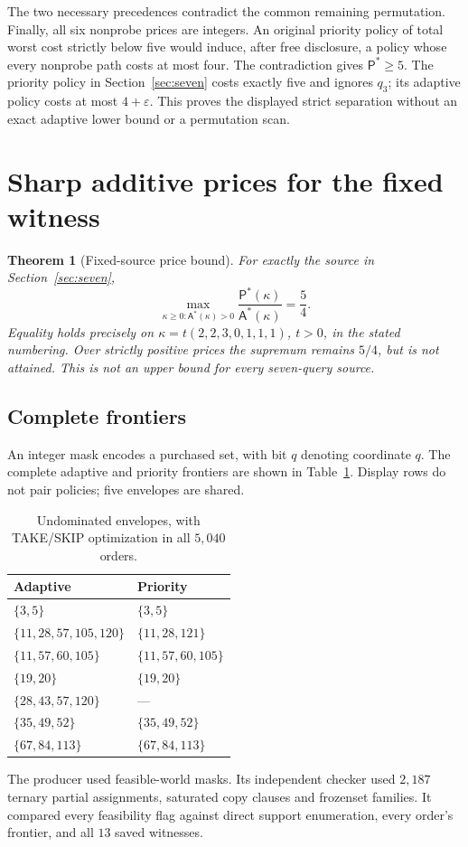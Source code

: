 \documentclass[pdflatex,sn-mathphys-num]{sn-jnl}
\newcommand{\A}{\mathsf{A}}
\newcommand{\Pcost}{\mathsf{P}}
\theoremstyle{thmstyleone}
\newtheorem{theorem}{Theorem}
\theoremstyle{thmstylethree}
\theoremstyle{thmstyletwo}
\begin{document}
The two necessary precedences contradict the common remaining
permutation. Finally, all six nonprobe prices are integers. An original
priority policy of total worst cost strictly below five would induce,
after free disclosure, a policy whose every nonprobe path costs at most
four. The contradiction gives $\Pcost^*\ge5$. The priority policy in
Section~\ref{sec:seven} costs exactly five and ignores $q_3$; its adaptive
policy costs at most $4+\varepsilon$. This proves the displayed strict
separation without an exact adaptive lower bound or a permutation scan.

\section{Sharp additive prices for the fixed witness}
\begin{theorem}[Fixed-source price bound]\label{thm:price}
For exactly the source in Section~\ref{sec:seven},
\[
 \max_{\kappa\geq0:\A^*(\kappa)>0}
 \frac{\Pcost^*(\kappa)}{\A^*(\kappa)}=\frac54.
\]
Equality holds precisely on $\kappa=t(2,2,3,0,1,1,1)$, $t>0$, in the stated numbering. Over strictly positive prices the supremum remains $5/4$, but is not attained. This is not an upper bound for every seven-query source.
\end{theorem}

\subsection{Complete frontiers}
An integer mask encodes a purchased set, with bit $q$ denoting coordinate $q$. The complete adaptive and priority frontiers are shown in Table~\ref{tab:frontiers}. Display rows do not pair policies; five envelopes are shared.
\begin{table}[ht]
\centering
\begin{tabular}{@{}ll@{}}\toprule
Adaptive & Priority\\\midrule
$\{3,5\}$ & $\{3,5\}$\\
$\{11,28,57,105,120\}$ & $\{11,28,121\}$\\
$\{11,57,60,105\}$ & $\{11,57,60,105\}$\\
$\{19,20\}$ & $\{19,20\}$\\
$\{28,43,57,120\}$ & ---\\
$\{35,49,52\}$ & $\{35,49,52\}$\\
$\{67,84,113\}$ & $\{67,84,113\}$\\\bottomrule
\end{tabular}
\caption{Undominated envelopes, with TAKE/SKIP optimization in all $5,040$ orders.}\label{tab:frontiers}
\end{table}
The producer used feasible-world masks. Its independent checker used $2,187$ ternary partial assignments, saturated copy clauses and frozenset families. It compared every feasibility flag against direct support enumeration, every order's frontier, and all $13$ saved witnesses.
\end{document}
